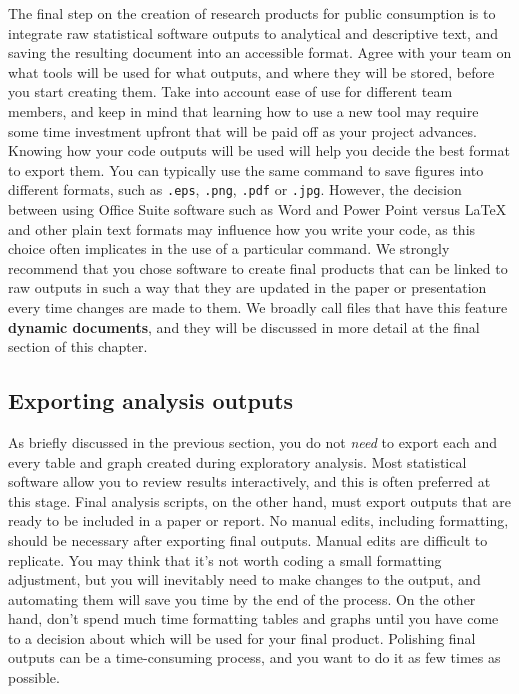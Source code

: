 The final step on the creation of research products for public consumption is to
integrate raw statistical software outputs to analytical and descriptive text,
and saving the resulting document into an accessible format.
Agree with your team on what tools will be used for what outputs, 
and where they will be stored, before you start creating them.
Take into account ease of use for different team members, and
keep in mind that learning how to use a new tool may require some
time investment upfront that will be paid off as your project advances.
Knowing how your code outputs will be used will help you decide the best format to export them.
You can typically use the same command to save figures into different formats, 
such as \texttt{.eps}, \texttt{.png}, \texttt{.pdf} or \texttt{.jpg}.
However, the decision between using Office Suite software such as Word and Power Point
versus {\LaTeX} and other plain text formats may influence how you write your code,
as this choice often implicates in the use of a particular command.
We strongly recommend that you chose software to create final products
that can be linked to raw outputs in such a way that they are updated
in the paper or presentation every time changes are made to them.
We broadly call files that have this feature \textbf{dynamic documents},
and they will be discussed in more detail at the final section of this chapter.


\subsection{Exporting analysis outputs}

As briefly discussed in the previous section,
you do not \textit{need} to export each and every table and graph created during exploratory analysis.
Most statistical software allow you to review results interactively,
and this is often preferred at this stage.
Final analysis scripts, on the other hand, must export outputs
that are ready to be included in a paper or report.
No manual edits, including formatting, 
should be necessary after exporting final outputs.
Manual edits are difficult to replicate.
You may think that it's not worth coding a small formatting adjustment,
but you will inevitably need to make changes to the output,
and automating them will save you time by the end of the process.
On the other hand, don't spend much time formatting tables and graphs until 
you have come to a decision about which will be used for your final product.
Polishing final outputs can be a time-consuming process,
and you want to do it as few times as possible.

